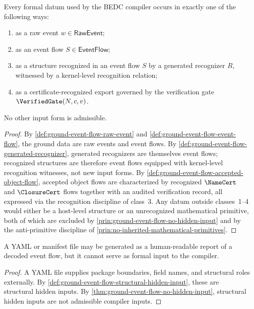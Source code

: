 \begin{theorem}
\label{thm:ground-event-flow-no-hidden-input}
Every formal datum used by the BEDC compiler occurs in exactly one of the following ways:
\begin{enumerate}
  \item as a raw event $w \in \mathsf{RawEvent}$;
  \item as an event flow $S \in \mathsf{EventFlow}$;
  \item as a structure recognized in an event flow $S$ by a generated recognizer $R$, witnessed by a kernel-level recognition relation;
  \item as a certificate-recognized export governed by the verification gate $\VerifiedGate(N, c, v)$.
\end{enumerate}
No other input form is admissible.
\end{theorem}

\begin{proof}
By \autoref{def:ground-event-flow-raw-event} and \autoref{def:ground-event-flow-event-flow}, the ground data are raw events and event flows. By \autoref{def:ground-event-flow-generated-recognizer}, generated recognizers are themselves event flows; recognized structures are therefore event flows equipped with kernel-level recognition witnesses, not new input forms. By \autoref{def:ground-event-flow-accepted-object-flow}, accepted object flows are characterized by recognized $\NameCert$ and $\ClosureCert$ flows together with an audited verification record, all expressed via the recognition discipline of class~3. Any datum outside classes~1--4 would either be a host-level structure or an unrecognized mathematical primitive, both of which are excluded by \autoref{prin:ground-event-flow-no-hidden-input} and by the anti-primitive discipline of \autoref{prin:no-inherited-mathematical-primitives}.
\end{proof}

\begin{corollary}
\label{cor:ground-event-flow-yaml-not-input}
A YAML or manifest file may be generated as a human-readable report of a decoded event flow, but it cannot serve as formal input to the compiler.
\end{corollary}

\begin{proof}
A YAML file supplies package boundaries, field names, and structural roles externally. By \autoref{def:ground-event-flow-structural-hidden-input}, these are structural hidden inputs. By \autoref{thm:ground-event-flow-no-hidden-input}, structural hidden inputs are not admissible compiler inputs.
\end{proof}

